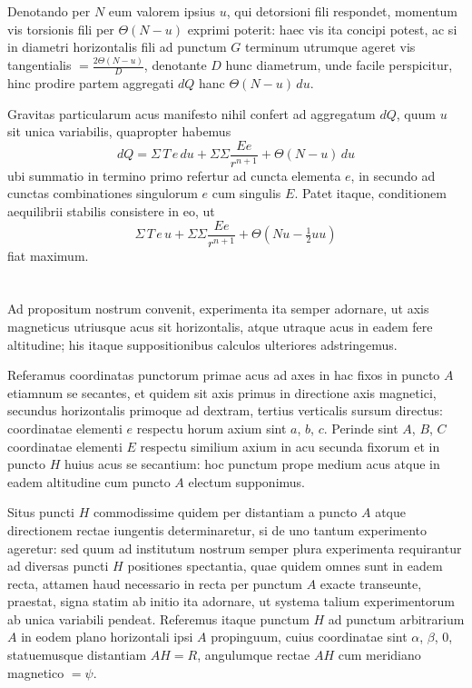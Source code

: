 \documentclass[fontsize=11pt,paper=a4,twoside,openany]{scrbook}
\begin{document}
Denotando per $N$ eum valorem ipsius $u$, qui detorsioni fili respondet, momentum vis torsionis fili per $\Theta(N-u)$ exprimi poterit: haec vis ita concipi potest, ac si in diametri horizontalis fili ad punctum $G$ terminum utrumque ageret vis tangentialis $=\frac{2\Theta(N-u)}{D}$, denotante $D$ hunc diametrum, unde facile perspicitur, hinc prodire partem aggregati $dQ$ hanc $\Theta(N-u)\,du$.

Gravitas particularum acus manifesto nihil confert ad aggregatum $dQ$, quum $u$ sit unica variabilis, quapropter habemus
\[
dQ = \Sigma\,T\,e\,du + \Sigma\Sigma\frac{Ee}{r^{n+1}} + \Theta(N-u)\,du
\]
ubi summatio in termino primo refertur ad cuncta elementa $e$, in secundo ad cunctas combinationes singulorum $e$ cum singulis $E$. Patet itaque, conditionem aequilibrii stabilis consistere in eo, ut
\[
\Sigma\,T\,e\,u + \Sigma\Sigma\frac{Ee}{r^{n+1}} + \Theta(Nu-\tfrac{1}{2}uu)
\]
fiat maximum.

\section{}

Ad propositum nostrum convenit, experimenta ita semper adornare, ut axis magneticus utriusque acus sit horizontalis, atque utraque acus in eadem fere altitudine; his itaque suppositionibus calculos ulteriores adstringemus.

Referamus coordinatas punctorum primae acus ad axes in hac fixos in puncto $A$ etiamnum se secantes, et quidem sit axis primus in directione axis magnetici, secundus horizontalis primoque ad dextram, tertius verticalis sursum directus: coordinatae elementi $e$ respectu horum axium sint $a$, $b$, $c$. Perinde sint $A$, $B$, $C$ coordinatae elementi $E$ respectu similium axium in acu secunda fixorum et in puncto $H$ huius acus se secantium: hoc punctum prope medium acus atque in eadem altitudine cum puncto $A$ electum supponimus.

Situs puncti $H$ commodissime quidem per distantiam a puncto $A$ atque directionem rectae iungentis determinaretur, si de uno tantum experimento ageretur: sed quum ad institutum nostrum semper plura experimenta requirantur ad diversas puncti $H$ positiones spectantia, quae quidem omnes sunt in eadem recta, attamen haud necessario in recta per punctum $A$ exacte transeunte, praestat, signa statim ab initio ita adornare, ut systema talium experimentorum ab unica variabili pendeat. Referemus itaque punctum $H$ ad punctum arbitrarium $A$ in eodem plano horizontali ipsi $A$ propinguum, cuius coordinatae sint $\alpha$, $\beta$, $0$, statuemusque distantiam $AH=R$, angulumque rectae $AH$ cum meridiano magnetico $=\psi$.
\end{document}
